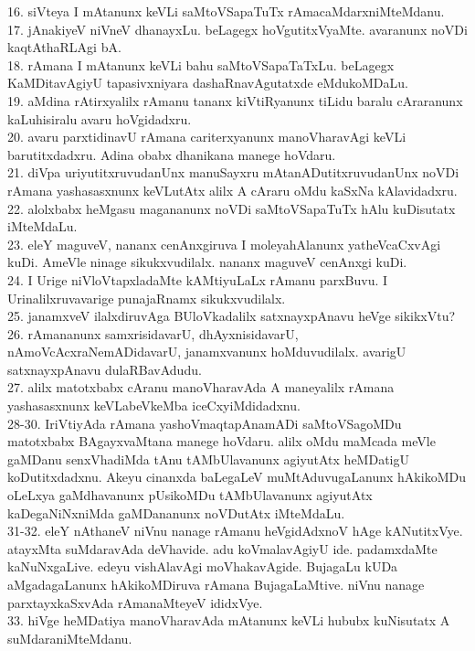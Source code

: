 \documentclass{article}
\begin{document}
16. siVteya I mAtanunx keVLi saMtoVSapaTuTx rAmacaMdarxniMteMdanu.\\
17. jAnakiyeV niVneV dhanayxLu. beLagegx hoVgutitxVyaMte. avaranunx noVDi kaqtAthaRLAgi bA.\\
18. rAmana I mAtanunx keVLi bahu saMtoVSapaTaTxLu. beLagegx KaMDitavAgiyU tapasivxniyara dashaRnavAgutatxde eMdukoMDaLu.\\
19. aMdina rAtirxyalilx rAmanu tananx kiVtiRyanunx tiLidu baralu cAraranunx kaLuhisiralu avaru hoVgidadxru.\\
20. avaru parxtidinavU rAmana cariterxyanunx manoVharavAgi keVLi barutitxdadxru. Adina obabx dhanikana manege hoVdaru.\\
21. diVpa uriyutitxruvudanUnx manuSayxru mAtanADutitxruvudanUnx noVDi rAmana yashasasxnunx keVLutAtx alilx A cAraru oMdu kaSxNa kAlavidadxru.\\
22. alolxbabx heMgasu magananunx noVDi saMtoVSapaTuTx hAlu kuDisutatx iMteMdaLu.\\
23. eleY maguveV, nananx cenAnxgiruva I moleyahAlanunx yatheVcaCxvAgi kuDi. AmeVle ninage sikukxvudilalx. nananx maguveV cenAnxgi kuDi.\\
24. I Urige niVloVtapxladaMte kAMtiyuLaLx rAmanu parxBuvu. I Urinalilxruvavarige punajaRnamx sikukxvudilalx.\\
25. janamxveV ilalxdiruvAga BUloVkadalilx satxnayxpAnavu heVge sikikxVtu?\\
26. rAmananunx samxrisidavarU, dhAyxnisidavarU, nAmoVcAcxraNemADidavarU, janamxvanunx hoMduvudilalx. avarigU satxnayxpAnavu dulaRBavAdudu.\\
27. alilx matotxbabx cAranu manoVharavAda A maneyalilx rAmana yashasasxnunx keVLabeVkeMba iceCxyiMdidadxnu.\\
28-30. IriVtiyAda rAmana yashoVmaqtapAnamADi saMtoVSagoMDu matotxbabx BAgayxvaMtana manege hoVdaru. alilx oMdu maMcada meVle gaMDanu senxVhadiMda tAnu tAMbUlavanunx agiyutAtx heMDatigU koDutitxdadxnu. Akeyu cinanxda baLegaLeV muMtAduvugaLanunx hAkikoMDu oLeLxya gaMdhavanunx pUsikoMDu tAMbUlavanunx agiyutAtx kaDegaNiNxniMda gaMDananunx noVDutAtx iMteMdaLu.\\
31-32. eleY nAthaneV niVnu nanage rAmanu heVgidAdxnoV hAge kANutitxVye. atayxMta suMdaravAda deVhavide. adu koVmalavAgiyU ide. padamxdaMte kaNuNxgaLive. edeyu vishAlavAgi moVhakavAgide. BujagaLu kUDa aMgadagaLanunx hAkikoMDiruva rAmana BujagaLaMtive. niVnu nanage parxtayxkaSxvAda rAmanaMteyeV ididxVye.\\
33. hiVge heMDatiya manoVharavAda mAtanunx keVLi hububx kuNisutatx A suMdaraniMteMdanu.\\
\end{document}
